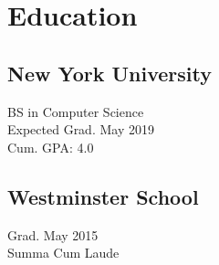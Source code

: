 \section{Education} 

\subsection{New York University}
BS in Computer Science \\
Expected Grad. May 2019 \\
Cum. GPA: 4.0\\
\sectionsep

\subsection{Westminster School}
Grad. May 2015 \\
Summa Cum Laude \\
\sectionsep